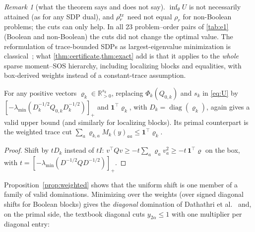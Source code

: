 \documentclass[a4paper,11pt]{article}
\theoremstyle{plain}
\theoremstyle{definition}
\theoremstyle{remark}
\newtheorem{remark}{Remark}
\newcommand{\R}{\mathbb{R}}
\newcommand{\diag}{\operatorname{diag}}
\newcommand{\lmin}{\lambda_{\min}}
\newcommand{\pos}[1]{[#1]_+}
\begin{document}
\begin{remark}[what the theorem says and does not say]
$\inf_\theta U$ is not necessarily attained (as for any SDP dual), and $\rho_r^{\rm tr}$ need not equal $\rho_r$ for non-Boolean problems; the cuts can only help. In all 23 problem--order pairs of \cref{tab:e1} (Boolean and non-Boolean) the cuts did not change the optimal value. The reformulation of trace-bounded SDPs as largest-eigenvalue minimization is classical~\cite{helmberg2000,mai2023spectral}; what \cref{thm:certificate,thm:exact} add is that it applies to the \emph{whole} sparse moment--SOS hierarchy, including localizing blocks and equalities, with box-derived weights instead of a constant-trace assumption.
\end{remark}

\begin{proposition}\label{prop:weighted}
For any positive vectors $\varrho_k\in\R^{s_k}_{>0}$, replacing $\Phi_k(Q_{0,k})$ and $s_k$ in \eqref{eq:U} by $\pos{-\lmin(D_k^{-1/2}Q_{0,k}D_k^{-1/2})}$ and $\mathbf 1^\top\varrho_k$, with $D_k=\diag(\varrho_k)$, again gives a valid upper bound (and similarly for localizing blocks). Its primal counterpart is the weighted trace cut $\sum_a\varrho_{k,a}M_k(y)_{aa}\le\mathbf 1^\top\varrho_k$.
\end{proposition}
\begin{proof}
Shift by $tD_k$ instead of $tI$: $v^\top Qv\ge-t\sum_a\varrho_av_a^2\ge-t\,\mathbf 1^\top\varrho$ on the box, with $t=\pos{-\lmin(D^{-1/2}QD^{-1/2})}$.
\end{proof}
\noindent Proposition~\ref{prop:weighted} shows that the uniform shift is one member of a family of valid dominations. Minimizing over the weights (over signed diagonal shifts for Boolean blocks) gives the \emph{diagonal} domination of Dathathri et al.~\cite{dathathri2020} and, on the primal side, the textbook diagonal cuts $y_{2\alpha}\le1$ with one multiplier per diagonal entry:
\end{document}
